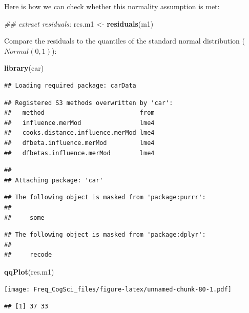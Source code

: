 \documentclass[12pt,]{krantz}
\newenvironment{Shaded}{\begin{snugshade}}{\end{snugshade}}
\newcommand{\CommentTok}[1]{\textcolor[rgb]{0.56,0.35,0.01}{\textit{#1}}}
\newcommand{\KeywordTok}[1]{\textcolor[rgb]{0.13,0.29,0.53}{\textbf{#1}}}
\newcommand{\NormalTok}[1]{#1}
\newcommand{\StringTok}[1]{\textcolor[rgb]{0.31,0.60,0.02}{#1}}
\begin{document}
Here is how we can check whether this normality assumption is met:

\begin{Shaded}
\begin{Highlighting}[]
\CommentTok{## extract residuals:}
\NormalTok{res.m1 <-}\StringTok{ }\KeywordTok{residuals}\NormalTok{(m1)}
\end{Highlighting}
\end{Shaded}

Compare the residuals to the quantiles of the standard normal distribution (\(Normal(0,1)\)):

\begin{Shaded}
\begin{Highlighting}[]
\KeywordTok{library}\NormalTok{(car)}
\end{Highlighting}
\end{Shaded}

\begin{verbatim}
## Loading required package: carData
\end{verbatim}

\begin{verbatim}
## Registered S3 methods overwritten by 'car':
##   method                          from
##   influence.merMod                lme4
##   cooks.distance.influence.merMod lme4
##   dfbeta.influence.merMod         lme4
##   dfbetas.influence.merMod        lme4
\end{verbatim}

\begin{verbatim}
## 
## Attaching package: 'car'
\end{verbatim}

\begin{verbatim}
## The following object is masked from 'package:purrr':
## 
##     some
\end{verbatim}

\begin{verbatim}
## The following object is masked from 'package:dplyr':
## 
##     recode
\end{verbatim}

\begin{Shaded}
\begin{Highlighting}[]
\KeywordTok{qqPlot}\NormalTok{(res.m1)}
\end{Highlighting}
\end{Shaded}

\texttt{[image: Freq\_CogSci\_files/figure-latex/unnamed-chunk-80-1.pdf]}

\begin{verbatim}
## [1] 37 33
\end{verbatim}
\end{document}
